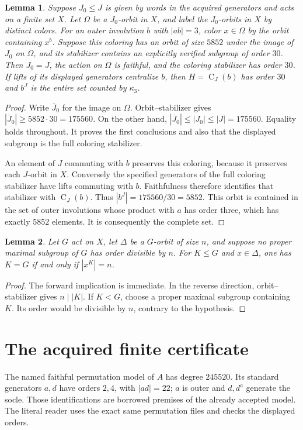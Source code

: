 \documentclass[11pt,a4paper]{article}
\newtheorem{lemma}{Lemma}
\newcommand{\C}{\operatorname{C}}
\begin{document}
\begin{lemma}\label{colors}
Suppose $J_0\le J$ is given by words in the acquired generators and acts
on a finite set $X$. Let $\Omega$ be a $J_0$-orbit in $X$, and label the
$J_0$-orbits in $X$ by distinct colors. For an outer involution $b$ with
$|ab|=3$, color $x\in\Omega$ by the orbit containing $x^b$.
Suppose this coloring has an orbit of size $5852$ under the image of
$J_0$ on $\Omega$, and its stabilizer contains an explicitly verified
subgroup of order $30$. Then $J_0=J$, the action on $\Omega$ is faithful,
and the coloring stabilizer has order $30$.
If lifts of its displayed generators centralize $b$, then
$H=\C_J(b)$ has order $30$ and $b^J$ is the entire set counted by
$\kappa_3$.
\end{lemma}
\begin{proof}
Write $\overline J_0$ for the image on $\Omega$. Orbit--stabilizer gives
$|\overline J_0|\ge5852\cdot30=175560$. On the other hand,
$|\overline J_0|\le |J_0|\le |J|=175560$. Equality holds throughout.
It proves the first conclusions and also that the displayed subgroup is
the full coloring stabilizer.

An element of $J$ commuting with $b$ preserves this coloring, because it
preserves each $J$-orbit in $X$. Conversely the specified generators of
the full coloring stabilizer have lifts commuting with $b$. Faithfulness
therefore identifies that stabilizer with $\C_J(b)$. Thus
$|b^J|=175560/30=5852$. This orbit is contained in the set of outer
involutions whose product with $a$ has order three, which has exactly
$5852$ elements. It is consequently the complete set.
\end{proof}

\begin{lemma}\label{generation}
Let $G$ act on $X$, let $\Delta$ be a $G$-orbit of size $n$, and suppose
no proper maximal subgroup of $G$ has order divisible by $n$.
For $K\le G$ and $x\in\Delta$, one has $K=G$ if and only if
$|x^K|=n$.
\end{lemma}
\begin{proof}
The forward implication is immediate. In the reverse direction,
orbit--stabilizer gives $n\mid |K|$. If $K<G$, choose a proper maximal
subgroup containing $K$. Its order would be divisible by $n$, contrary
to the hypothesis.
\end{proof}

\section{The acquired finite certificate}
The named faithful permutation model of $A$ has degree $245520$.
Its standard generators $a,d$ have orders $2,4$, with $|ad|=22$;
$a$ is outer and $d,d^a$ generate the socle. Those identifications are
borrowed premises of the already accepted model. The literal reader uses
the exact same permutation files and checks the displayed orders.
\end{document}

